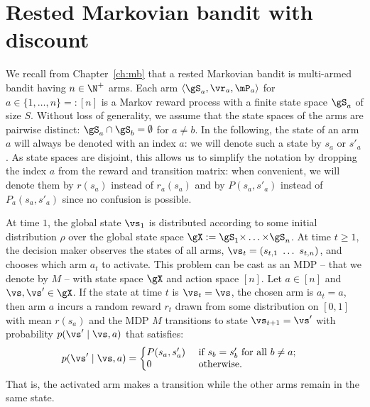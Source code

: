 \section{Rested Markovian bandit with discount}
\label{ch:rested:sec:bandits}


We recall from Chapter~\ref{ch:mb} that a rested Markovian bandit is multi-armed bandit having $n\in\N^+$ arms. Each arm $\langle\gS_a,\vr_a,\mP_a\rangle$ for $a\in\{1,\dots, n\}=:[n]$ is a Markov
reward process with a finite state space $\gS_a$ of size $S$. %
Without loss of generality, we assume
that the state spaces of the arms are pairwise distinct:
$\gS_a\cap\gS_b=\emptyset$ for $a\ne b$. In the following, the state of an
arm $a$ will always be denoted with an index $a$: we will denote such a
state by $s_a$ or $s'_a$. As state spaces are disjoint, this allows us to
simplify the notation by dropping the index $a$ from the reward and transition
matrix: when convenient, we will denote them by $r(s_a)$ instead of $r_a(s_a)$
and by $P(s_a,s'_a)$ instead of $P_a(s_a,s'_a)$ since no confusion is possible. 

At time $1$, the global state $\vs_1$ is distributed according to some initial
distribution $\rho$ over the global state space $\gX :=
\gS_1{\times}\dots{\times}\gS_n$. At time $t\ge 1$, the decision maker observes
the states
of all arms,
$\vs_t=(s_{t,1}\ \dots\ s_{t,n})$, and chooses which arm $a_t$ to activate.
This problem can be cast as an MDP -- that we denote by $M$ -- with state
space $\gX$ and action space \([n]\). Let $a\in[n]$ and $\vs,\vs'\in\gX$. If the state at time $t$ is $\vs_t=\vs$, the chosen arm is $a_t=a$, then arm $a$ incurs a random reward $r_t$ drawn from some distribution on \([0,1]\) with
mean \(r(s_a)\) and the MDP $M$ transitions to state $\vs_{t+1}=\vs'$ with probability \(p(\vs'\mid \vs,a)\) that satisfies:
\begin{align}
    \label{eq:defP}
    p(\vs' \mid \vs,a) 
    &= 
    \left\{
        \begin{array}{@{}ll@{}}
            P(s_a,s'_a) & \text{ if $s_{b}=s'_{b}$ for all $b\ne a$;}\\
            0 &\text{ otherwise}.
        \end{array}
    \right.
\end{align}
That is, the activated arm makes a transition while the other arms remain in
the same state.

